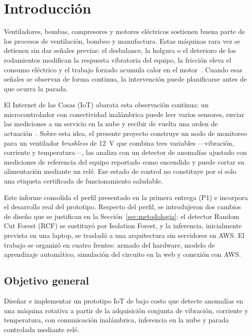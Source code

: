 \documentclass[10pt,twocolumn]{article}
\begin{document}
\section{Introducción}

Ventiladores, bombas, compresores y motores eléctricos sostienen buena parte de los procesos de
ventilación, bombeo y manufactura. Estas máquinas rara vez se detienen sin dar señales previas:
el desbalance, la holgura o el deterioro de los rodamientos modifican la respuesta vibratoria del
equipo, la fricción eleva el consumo eléctrico y el trabajo forzado acumula calor en el
motor~\cite{tiboni2022,lei2018}. Cuando esas señales se observan de forma continua, la
intervención puede planificarse antes de que ocurra la parada.

El Internet de las Cosas (IoT) abarata esta observación continua: un microcontrolador con
conectividad inalámbrica puede leer varios sensores, enviar las mediciones a un servicio en la
nube y recibir de vuelta una orden de actuación~\cite{compare2020}. Sobre esta idea, el presente
proyecto construye un nodo de monitoreo para un ventilador \textit{brushless} de 12~V que combina
tres variables ---vibración, corriente y temperatura---, las analiza con un detector de anomalías
ajustado con mediciones de referencia del equipo reportado como encendido y puede cortar su
alimentación mediante un relé. Ese estado de control no constituye por sí solo una etiqueta
certificada de funcionamiento saludable.

Este informe consolida el perfil presentado en la primera entrega (P1) e incorpora el desarrollo
real del prototipo. Respecto del perfil, se introdujeron dos cambios de diseño que se justifican
en la Sección~\ref{sec:metodologia}: el detector Random Cut Forest (RCF) se sustituyó por
Isolation Forest, y la inferencia, inicialmente prevista en una laptop, se trasladó a una
arquitectura sin servidores en AWS. El trabajo se organizó en cuatro frentes: armado del
hardware, modelo de aprendizaje automático, simulación del circuito en la web y conexión con AWS.

\subsection*{Objetivo general}
Diseñar e implementar un prototipo IoT de bajo costo que detecte anomalías en una máquina rotativa
a partir de la adquisición conjunta de vibración, corriente y temperatura, con comunicación
inalámbrica, inferencia en la nube y parada controlada mediante relé.
\end{document}
